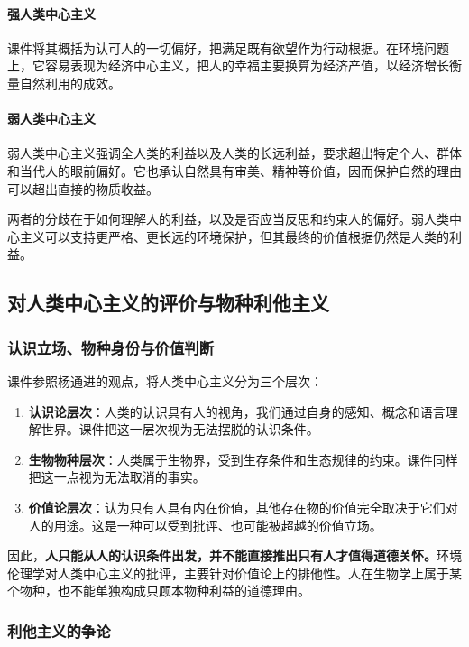\documentclass{ctexart}
\begin{document}
\paragraph{强人类中心主义}
课件将其概括为认可人的一切偏好，把满足既有欲望作为行动根据。在环境问题上，它容易表现为经济中心主义，把人的幸福主要换算为经济产值，以经济增长衡量自然利用的成效。

\paragraph{弱人类中心主义}
弱人类中心主义强调全人类的利益以及人类的长远利益，要求超出特定个人、群体和当代人的眼前偏好。它也承认自然具有审美、精神等价值，因而保护自然的理由可以超出直接的物质收益。

两者的分歧在于如何理解人的利益，以及是否应当反思和约束人的偏好。弱人类中心主义可以支持更严格、更长远的环境保护，但其最终的价值根据仍然是人类的利益。

\subsection{对人类中心主义的评价与物种利他主义}

\subsubsection{认识立场、物种身份与价值判断}

课件参照杨通进的观点，将人类中心主义分为三个层次：

\begin{enumerate}
    \item \textbf{认识论层次}：人类的认识具有人的视角，我们通过自身的感知、概念和语言理解世界。课件把这一层次视为无法摆脱的认识条件。
    \item \textbf{生物物种层次}：人类属于生物界，受到生存条件和生态规律的约束。课件同样把这一点视为无法取消的事实。
    \item \textbf{价值论层次}：认为只有人具有内在价值，其他存在物的价值完全取决于它们对人的用途。这是一种可以受到批评、也可能被超越的价值立场。
\end{enumerate}

因此，\textbf{人只能从人的认识条件出发，并不能直接推出只有人才值得道德关怀。}环境伦理学对人类中心主义的批评，主要针对价值论上的排他性。人在生物学上属于某个物种，也不能单独构成只顾本物种利益的道德理由。

\subsubsection{利他主义的争论}
\end{document}
